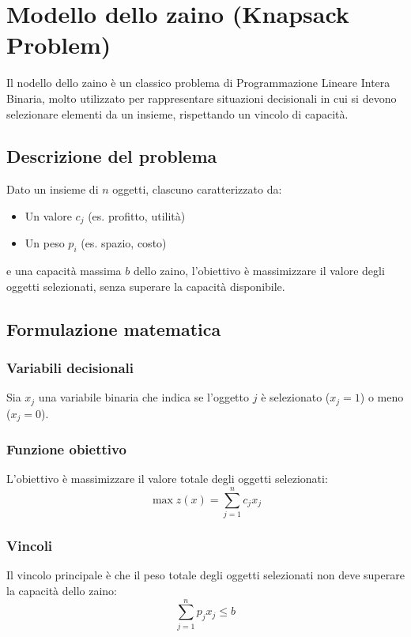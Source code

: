\section{Modello dello zaino (Knapsack Problem)}

Il nodello dello zaino è un classico problema di Programmazione Lineare 
Intera Binaria, molto utilizzato per rappresentare situazioni decisionali 
in cui si devono selezionare elementi da un insieme, rispettando un 
vincolo di capacità.

\subsection{Descrizione del problema}
Dato un insieme di $n$ oggetti, clascuno caratterizzato da:
\begin{itemize}
    \item Un valore $c_j$ (es. profitto, utilità)
    \item Un peso $p_i$ (es. spazio, costo)
\end{itemize}

e una capacità massima $b$ dello zaino, l'obiettivo è massimizzare il 
valore degli oggetti selezionati, senza superare la capacità disponibile.

\subsection{Formulazione matematica}
\subsubsection{Variabili decisionali}

Sia $x_j$ una variabile binaria che indica se l'oggetto $j$ è selezionato ($x_j = 1$) o meno ($x_j = 0$).

\subsubsection{Funzione obiettivo}
L'obiettivo è massimizzare il valore totale degli oggetti selezionati:
\[
\max z(x) = \sum_{j=1}^{n} c_j x_j
\]

\subsubsection{Vincoli}
Il vincolo principale è che il peso totale degli oggetti selezionati non deve superare la capacità dello zaino:
\[
\sum_{j=1}^{n} p_j x_j \leq b
\]

